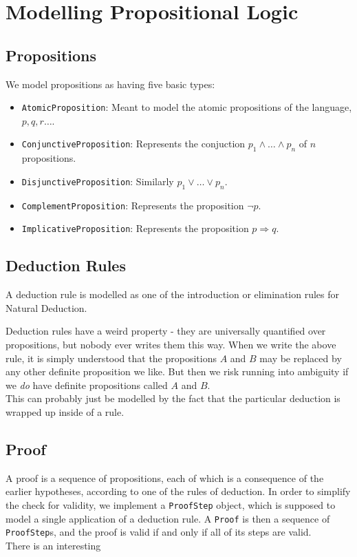 \documentclass{article}
\begin{document}
	\section*{Modelling Propositional Logic}
	\subsection*{Propositions}
	We model propositions as having five basic types: 
	\begin{itemize}
		\item \texttt{AtomicProposition}: Meant to model the atomic propositions of the language, $p,q,r\ldots$. 
		\item \texttt{ConjunctiveProposition}: Represents the conjuction $p_{1} \wedge \ldots \wedge p_{n}$ of $n$ propositions.
		\item \texttt{DisjunctiveProposition}: Similarly $p_{1} \vee \ldots \vee p_{n}$. 
		\item \texttt{ComplementProposition}: Represents the proposition $\neg p$. 
		\item \texttt{ImplicativeProposition}: Represents the proposition $p \Rightarrow q$. 
	\end{itemize}
	
	\subsection*{Deduction Rules}
	A deduction rule is modelled as one of the introduction or elimination rules for Natural Deduction. 
	
	\begin{prooftree}
	\end{prooftree}
	
	Deduction rules have a weird property - they are universally quantified over propositions, but nobody ever writes them this way. When we write the above rule, it is simply understood that the propositions $A$ and $B$ may be replaced by any other definite proposition we like. But then we risk running into ambiguity if we \textit{do} have definite propositions called $A$ and $B$. \\
	
	This can probably just be modelled by the fact that the particular deduction is wrapped up inside of a rule. 
	
	\subsection*{Proof}
	A proof is a sequence of propositions, each of which is a consequence of the earlier hypotheses, according to one of the rules of deduction. In order to simplify the check for validity, we implement a \texttt{ProofStep} object, which is supposed to model a single application of a deduction rule. A \texttt{Proof} is then a sequence of \texttt{ProofStep}s, and the proof is valid if and only if all of its steps are valid. \\
	
	There is an interesting 
\end{document}
